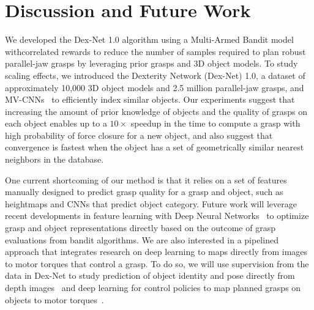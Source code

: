 \section{Discussion and Future Work}
We developed the Dex-Net 1.0 algorithm using a Multi-Armed Bandit model withcorrelated rewards to reduce the number of samples required to plan robust parallel-jaw grasps by leveraging prior grasps and 3D object models.
To study scaling effects, we introduced the Dexterity Network (Dex-Net) 1.0, a dataset of approximately 10,000 3D object models and 2.5 million parallel-jaw grasps, and MV-CNNs~\cite{su2015multi} to efficiently index similar objects.
Our experiments suggest that increasing the amount of prior knowledge of objects and the quality of grasps on each object enables up to a $10\times$ speedup in the time to compute a grasp with high probability of force closure for a new object, and also suggest that convergence is fastest when the object has a set of geometrically similar nearest neighbors in the database.

One current shortcoming of our method is that it relies on a set of features manually designed to predict grasp quality for a grasp and object, such as heightmaps and CNNs that predict object category.
Future work will leverage recent developments in feature learning with Deep Neural Networks~\cite{krizhevsky2012imagenet} to optimize grasp and object representations directly based on the outcome of grasp evaluations from bandit algorithms.
We are also interested in a pipelined approach that integrates research on deep learning to maps directly from images to motor torques that control a grasp.
To do so, we will use supervision from the data in Dex-Net to study prediction of object identity and pose directly from depth images~\cite{aubry2015understanding, guptaCVPR15a} and deep learning for control policies to map planned grasps on objects to motor torques~\cite{levine2015end}. 


